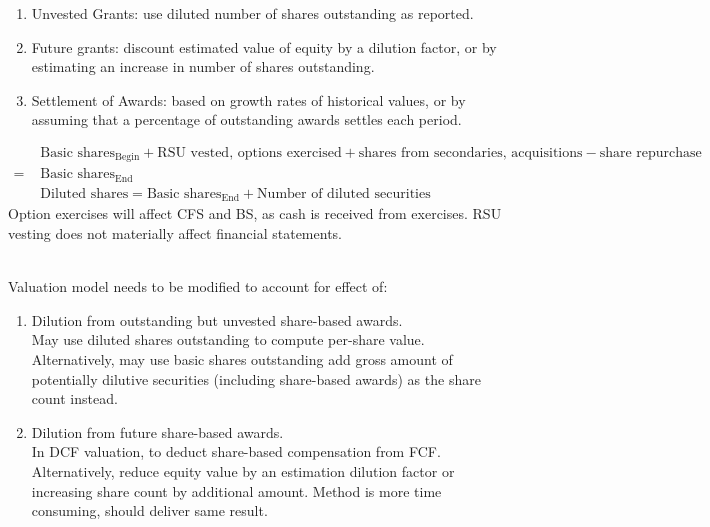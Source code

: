 \begin{remark} 
\begin{enumerate}[label=\roman*.]
\setlength{\itemsep}{0pt}
\item Unvested Grants: use diluted number of shares outstanding as reported.
\item Future grants: discount estimated value of equity by a dilution factor, or by estimating an increase in number of shares outstanding.
\item Settlement of Awards: based on growth rates of historical values, or by assuming that a percentage of outstanding awards settles each period.
\end{enumerate}
\begin{align}
&\text{ Basic shares}_{\text{Begin}} + \text{RSU vested, options exercised} + \text{shares from secondaries, acquisitions} - \text{share repurchase} \nonumber \\
= &\text{ Basic shares}_{\text{End}} \nonumber \\
&\text{ Diluted shares} = \text{Basic shares}_{\text{End}} + \text{Number of diluted securities} \nonumber
\end{align}
Option exercises will affect CFS and BS, as cash is received from exercises. RSU vesting does not materially affect financial statements.
\end{remark}

\begin{remark} \\
Valuation model needs to be modified to account for effect of:
\begin{enumerate}[label=\roman*.]
\setlength{\itemsep}{0pt}
\item Dilution from outstanding but unvested share-based awards.\\
May use diluted shares outstanding to compute per-share value.\\
Alternatively, may use basic shares outstanding add gross amount of potentially dilutive securities (including share-based awards) as the share count instead.
\item Dilution from future share-based awards.\\
In DCF valuation, to deduct share-based compensation from FCF.\\
Alternatively, reduce equity value by an estimation dilution factor or increasing share count by additional amount. Method is more time consuming, should deliver same result.
\end{enumerate}
\end{remark}

